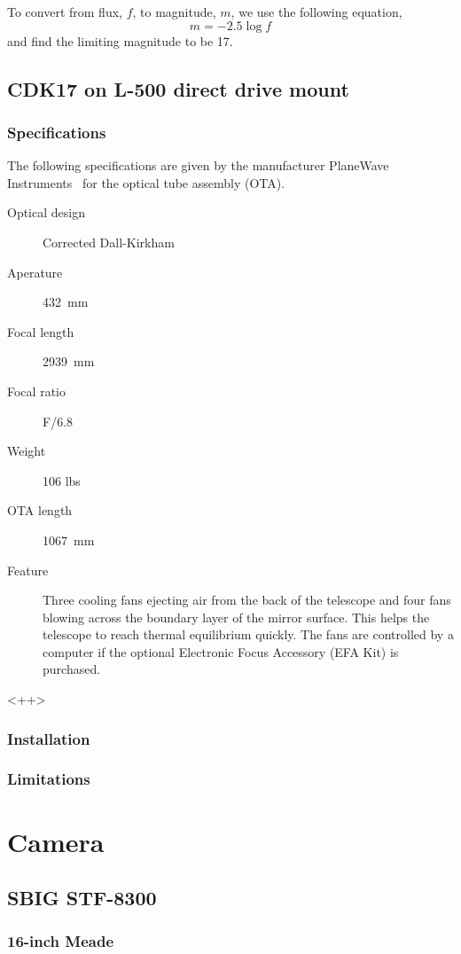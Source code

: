 To convert from flux, $f$, to magnitude, $m$, we use the following equation,
\begin{equation}
    m = -2.5 \log{f}
    \label{eq:mag2flux}
\end{equation}
and find the limiting magnitude to be 17.

\subsection{CDK17 on L-500 direct drive mount}
\subsubsection{Specifications}
The following specifications are given by the manufacturer PlaneWave Instruments~\cite{cdk17} for the optical tube assembly (OTA).
\begin{description}
    \item[Optical design] Corrected Dall-Kirkham
    \item[Aperature] \SI{432}{\milli\meter}
    \item[Focal length] \SI{2939}{\milli\meter}
    \item[Focal ratio] F/6.8
    \item[Weight] 106 lbs
    \item[OTA length] \SI{1067}{\milli\meter}
    \item[Feature] Three cooling fans ejecting air from the back of the telescope and four fans blowing across the boundary layer of the mirror surface. This helps the telescope to reach thermal equilibrium quickly. The fans are controlled by a computer if the optional Electronic Focus Accessory (EFA Kit) is purchased.
\end{description}<++>
\subsubsection{Installation}
\subsubsection{Limitations}

\section{Camera}
\subsection{SBIG STF-8300}
\subsubsection{16-inch Meade}

